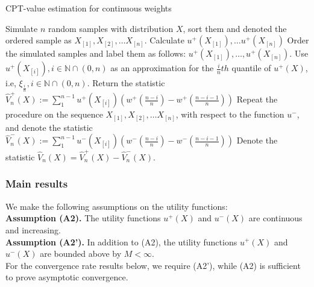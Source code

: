\documentclass[11pt,letterpaper,english]{article}
\begin{document}
\begin{algorithm}
\caption{CPT-value estimation for \holder continuous weights}
\label{alg:holder-est}
\begin{algorithmic}[1]
\State Simulate $n$ random samples with distribution $X$, sort them and denoted the ordered sample as 
$X_{[1]}, X_{[2]}, \ldots X_{[n]}$.
\State Calculate $u^+(X_{[1]}),\ldots u^+(X_{[n]})$
\State Order the simulated samples and label them as follows: 
$u^+(X_{[1]}),\ldots,u^+(X_{[n]})$.
\State Use $u^+(X_{[i]}), i\in \mathbb{N}\cap (0,n)$ as an approximation for the $\frac{i}{n} th$ quantile of $u^+(X)$, i.e, $\xi_{\frac{i}{n}}, i\in \mathbb{N}\cap (0,n)$.
\State Return the statistic 
$\hat V^+_n(X):=\sum_1^{n-1} u^+(X_{[i]}) (w^+(\frac{n-i}{n})- w^+(\frac{n-i-1}{n}) )$
\State Repeat the procedure on the sequence $X_{[1]}, X_{[2]}, \ldots X_{[n]}$, with respect to the function $u^-$, 
and denote the statistic $\hat V^-_n (X):=\sum_1^{n-1} u^-(X_{[i]}) (w^-(\frac{n-i}{n})- w^-(\frac{n-i-1}{n}) ) $
\State Denote the statistic $\hat V_n(X) =\hat V^+_n(X) - \hat V^-_n(X)$.
\end{algorithmic}
\end{algorithm}

\subsubsection*{Main results}
We make the following assumptions on the utility functions:\\[1ex]
\textbf{Assumption (A2).}  The utility functions $u^+(X)$ and $u^-(X)$ are continuous and increasing.\\[1ex]
\textbf{Assumption (A2').}  In addition to (A2), the utility functions $u^+(X)$ and $u^-(X)$ are bounded above by $M<\infty$.\\[1ex]
For the convergence rate results below, we require (A2'), while (A2) is sufficient to prove asymptotic convergence.
\end{document}
